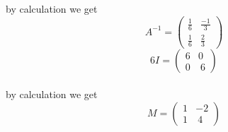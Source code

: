 \documentclass[journal,12pt,twocolumn]{IEEEtran}
\newcommand{\myvec}[1]{\ensuremath{\begin{pmatrix}#1\end{pmatrix}}}
\begin{document}
 by calculation we get   
 \begin{equation}
  A^{-1}=\myvec{
      \frac{1}{6} & \frac{-1}{3}\\
    \frac{1}{6} & \frac{2}{3}
     }
  \end{equation}
  \begin{equation}
 6I=\myvec{
    6&0 \\
    0 & \ 6
     }
       \end{equation}\\
 by calculation we get 
 \begin{equation}
 M=\myvec{
    1&-2 \\
    1 & \ 4
     }
     \end{equation}
\end{document}
